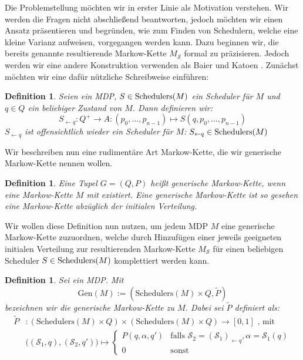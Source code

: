 \documentclass[a4paper]{article}
\newcommand{\mc}{Markow-Kette}
\newtheorem{definition}[satz]{Definition} %
\theoremstyle{nonumberplain}
\begin{document}
Die Problemstellung möchten wir in erster Linie als Motivation verstehen. Wir werden die Fragen nicht abschließend beantworten, jedoch möchten wir einen Ansatz präsentieren und begründen, wie zum Finden von Schedulern, welche eine kleine Varianz aufweisen, vorgegangen werden kann.
Dazu beginnen wir, die bereits genannte resultierende \mc{} $M_{\mathcal{S}}$ formal zu präzisieren. Jedoch werden wir eine andere Konstruktion verwenden als Baier und Katoen \cite{Bai08}. Zunächst möchten wir eine dafür nützliche Schreibweise einführen:
\begin{definition}
	Seien \mdpex{} ein MDP, $S\in \mathrm{Schedulers}(M)$ ein Scheduler für $M$ und $q\in Q$ ein beliebiger Zustand von $M$. Dann definieren wir:
	\begin{equation}
		S_{\leftarrow q} : Q^+ \to A : (p_0,\dots,p_{n-1}) \mapsto S(q,p_0,\dots,p_{n-1})
	\end{equation}
	$S_{\leftarrow q}$ ist offensichtlich wieder ein Scheduler für $M$: $S_{\leftarrow q} \in \mathrm{Schedulers}(M)$
\end{definition}

\newcommand{\gmc}{generische \mc{}}
Wir beschreiben nun eine rudimentäre Art \mc{}, die wir \gmc{} nennen wollen.
\begin{definition}
	Eine Tupel $G=(Q,P)$ heißt \gmc{}, wenn eine \mc{} $M$ mit \mcex{} existiert. Eine \gmc{} ist so gesehen eine \mc{} abzüglich der initialen Verteilung.
\end{definition}

Wir wollen diese Definition nun nutzen, um jedem MDP $M$ eine \gmc{} zuzuordnen, welche durch Hinzufügen einer jeweils geeigneten initialen Verteilung zur resultierenden \mc{} $M_\mathcal{S}$ für einen beliebigen Scheduler $S \in \mathrm{Schedulers}(M)$ komplettiert werden kann.

\newcommand{\mgen}{\mathrm{Gen}}
\begin{definition}
	Sei \mdpex{} ein MDP. Mit
	\begin{equation}
		\mgen(M):= (\mathrm{Schedulers}(M)\times Q,\tilde{P})
	\end{equation}
	bezeichnen wir die \gmc{} zu $M$. Dabei sei $\tilde{P}$ definiert als:
	\begin{align}
		\tilde{P} &: (\mathrm{Schedulers}(M)\times Q) \times (\mathrm{Schedulers}(M)\times Q) \to [0,1]\text{ , mit} \nonumber \\
		&\big((\mathcal{S}_1,q),(\mathcal{S}_2,q')\big) \mapsto \begin{cases}
		P(q,\alpha,q') & \text{falls } \mathcal{S}_2 = (\mathcal{S}_1)_{\leftarrow q}, \alpha = \mathcal{S}_1(q)\\
		0 & \text{sonst}
		\end{cases}
	\end{align}
\end{definition}
\end{document}
